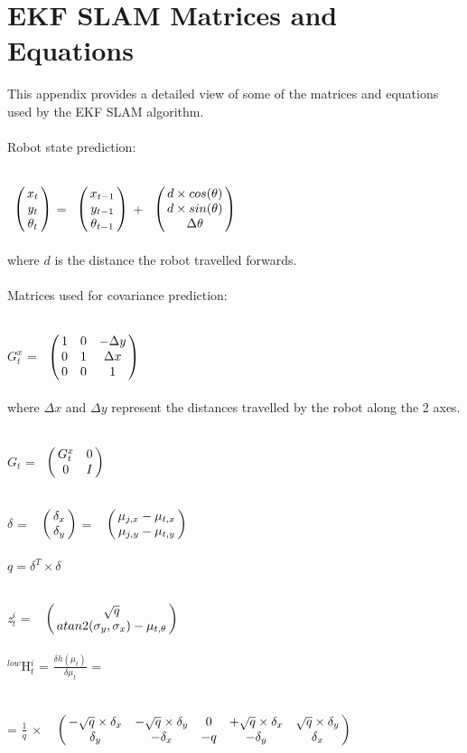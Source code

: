 \documentclass{ba-kecs}
\numberwithin{figure}{section}
\numberwithin{equation}{section}
\begin{document}
\section{EKF SLAM Matrices and Equations}
This appendix provides a detailed view of some of the matrices and equations used by the EKF SLAM algorithm.\\ \\
Robot state prediction:

$\bordermatrix{ 	& \cr
                 &x_{t} \cr
                 &y_{t} \cr
                 &\theta_{t} \cr}$
=
$\bordermatrix{ 	& \cr
                 &x_{t-1} \cr
                 &y_{t-1} \cr
                 &\theta_{t-1} \cr}$
+
$\bordermatrix{ 	& \cr
                 &d \times cos(\theta) \cr
                 &d \times sin(\theta) \cr
                 &\Delta\theta \cr}$ \\ \\
where $d$ is the distance the robot travelled forwards. \\ \\
Matrices used for covariance prediction:

$G_t^x$ = 
$\bordermatrix{ 	& \cr
                 &1 & 0 & -\Delta y \cr
                 &0 & 1 & \Delta x \cr
                 &0 & 0 & 1 \cr}$ \\ \\
where $\Delta x$ and $\Delta y$ represent the distances travelled by the robot along the 2 axes.

$G_t$ = 
$\bordermatrix{ 	& \cr
                 &G_t^x & 0 \cr
                 &0 & I \cr}$
                 
$\delta$ = $\bordermatrix{~ \cr
                        & \delta_{x} \cr
                        & \delta_{y}}$ = $\bordermatrix{~ \cr
                                                                                                & \mu_{j,x} - \mu_{t,x} \cr
                                                                & \mu_{j,y} - \mu_{t,y} \cr}$\\ \\

$\textit{q} = \delta^{T} \times \delta$

\textit{z}$^{i}_{t}$ = $\bordermatrix{~ \cr
                        & \sqrt{q} \cr
                        & atan2(\sigma_{y},\sigma_{x}) - \mu_{t,\theta}}$\\ \\
                                          
$^{low}$H$^{i}_{t}$ = $\frac{\delta h(\mu_{t})}{\delta{\mu_{t}}}$ = \\ \\ = $\frac{1}{q}$ $\times$ $\bordermatrix{~ \cr
                                & -\sqrt{q} \times \delta_{x} & -\sqrt{q} \times \delta_{y} & 0 & +\sqrt{q} \times \delta_{x} & \sqrt{q} \times \delta_{y} \cr
                                & \delta_{y} & -\delta_{x} & -q & -\delta_{y} & \delta_{x}} $\\ \\
                                                  
\end{document}
